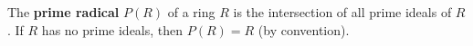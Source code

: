The \textbf{prime radical} $P(R)$ of a ring $R$ is the intersection of all prime ideals of $R$. If $R$ has no prime ideals, then $P(R) = R$ (by convention).
